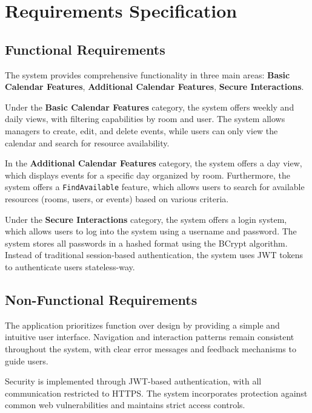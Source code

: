 \section{Requirements Specification}\label{sec:requirements-specification}

\subsection{Functional Requirements}\label{subsec:functional-requirements}
The system provides comprehensive functionality in three main areas: \textbf{Basic Calendar Features}, \textbf{Additional Calendar Features}, \textbf{Secure Interactions}.

Under the \textbf{Basic Calendar Features} category, the system offers weekly and daily views, with filtering capabilities by room and user.
The system allows managers to create, edit, and delete events, while users can only view the calendar and search for resource availability.

In the \textbf{Additional Calendar Features} category, the system offers a day view, which displays events for a specific day organized by room.
Furthermore, the system offers a \texttt{FindAvailable} feature, which allows users to search for available resources (rooms, users, or events) based on various criteria.

Under the \textbf{Secure Interactions} category, the system offers a login system, which allows users to log into the system using a username and password.
The system stores all passwords in a hashed format using the BCrypt algorithm.
Instead of traditional session-based authentication, the system uses JWT tokens to authenticate users stateless-way.


\subsection{Non-Functional Requirements}\label{subsec:non-functional-requirements}

The application prioritizes function over design by providing a simple and intuitive user interface.
Navigation and interaction patterns remain consistent throughout the system, with clear error messages and feedback mechanisms to guide users.

Security is implemented through JWT-based authentication, with all communication restricted to HTTPS. The system incorporates protection against common web vulnerabilities and maintains strict access controls.

